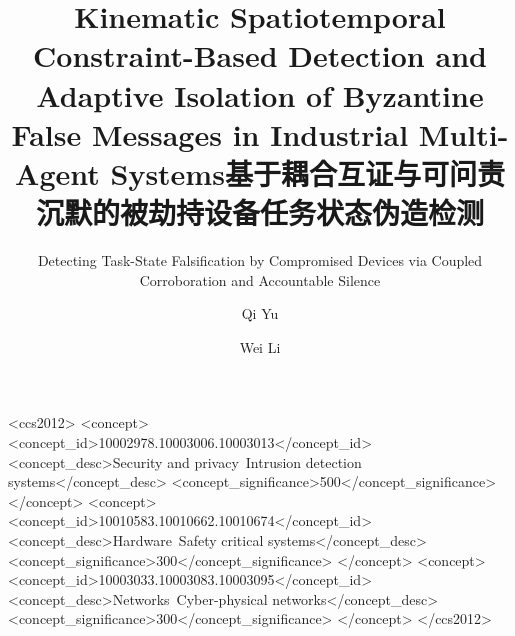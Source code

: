 \documentclass[manuscript,screen,review]{acmart}
\begin{document}
\title{Kinematic Spatiotemporal Constraint-Based Detection and Adaptive Isolation of Byzantine False Messages in Industrial Multi-Agent Systems}

\author{Qi Yu}


\author{Wei Li}




\title{基于耦合互证与可问责沉默的被劫持设备任务状态伪造检测}
\subtitle{Detecting Task-State Falsification by Compromised Devices via Coupled Corroboration and Accountable Silence}

\renewcommand{\shortauthors}{Yu and Li}

\begin{CCSXML}
<ccs2012>
 <concept>
  <concept_id>10002978.10003006.10003013</concept_id>
  <concept_desc>Security and privacy~Intrusion detection systems</concept_desc>
  <concept_significance>500</concept_significance>
 </concept>
 <concept>
  <concept_id>10010583.10010662.10010674</concept_id>
  <concept_desc>Hardware~Safety critical systems</concept_desc>
  <concept_significance>300</concept_significance>
 </concept>
 <concept>
  <concept_id>10003033.10003083.10003095</concept_id>
  <concept_desc>Networks~Cyber-physical networks</concept_desc>
  <concept_significance>300</concept_significance>
 </concept>
</ccs2012>
\end{CCSXML}
\end{document}
